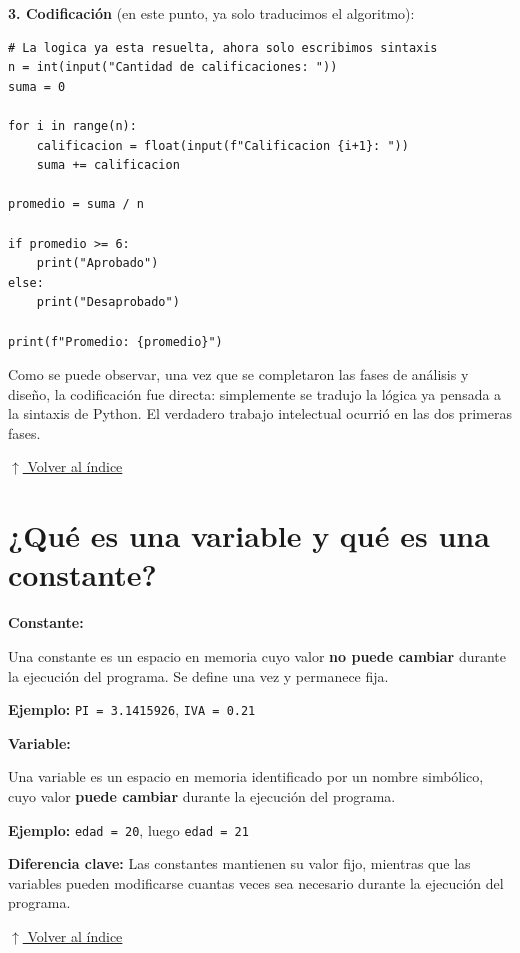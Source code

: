 \documentclass[12pt]{article}
\newcommand{\codigo}[1]{\texttt{\small #1}}
\newcommand{\volverindice}{%
    \vspace{1em}%
    \begin{flushright}%
        \hyperlink{indice}{\small $\uparrow$ Volver al índice}%
    \end{flushright}%
}
\begin{document}
\textbf{3. Codificación} (en este punto, ya solo traducimos el algoritmo):

\begin{lstlisting}[style=python, caption={Ejemplo en Python}]
# La logica ya esta resuelta, ahora solo escribimos sintaxis
n = int(input("Cantidad de calificaciones: "))
suma = 0

for i in range(n):
    calificacion = float(input(f"Calificacion {i+1}: "))
    suma += calificacion

promedio = suma / n

if promedio >= 6:
    print("Aprobado")
else:
    print("Desaprobado")
    
print(f"Promedio: {promedio}")
\end{lstlisting}

Como se puede observar, una vez que se completaron las fases de análisis y diseño, la codificación fue directa: simplemente se tradujo la lógica ya pensada a la sintaxis de Python. El verdadero trabajo intelectual ocurrió en las dos primeras fases.

\volverindice
\newpage


\section{¿Qué es una variable y qué es una constante?}

\textbf{Constante:}

Una constante es un espacio en memoria cuyo valor \textbf{no puede cambiar} durante la ejecución del programa. Se define una vez y permanece fija.

\textbf{Ejemplo:} \codigo{PI = 3.1415926}, \codigo{IVA = 0.21}

\textbf{Variable:}

Una variable es un espacio en memoria identificado por un nombre simbólico, cuyo valor \textbf{puede cambiar} durante la ejecución del programa.

\textbf{Ejemplo:} \codigo{edad = 20}, luego \codigo{edad = 21}

\textbf{Diferencia clave:} Las constantes mantienen su valor fijo, mientras que las variables pueden modificarse cuantas veces sea necesario durante la ejecución del programa.

\volverindice
\newpage

\end{document}
